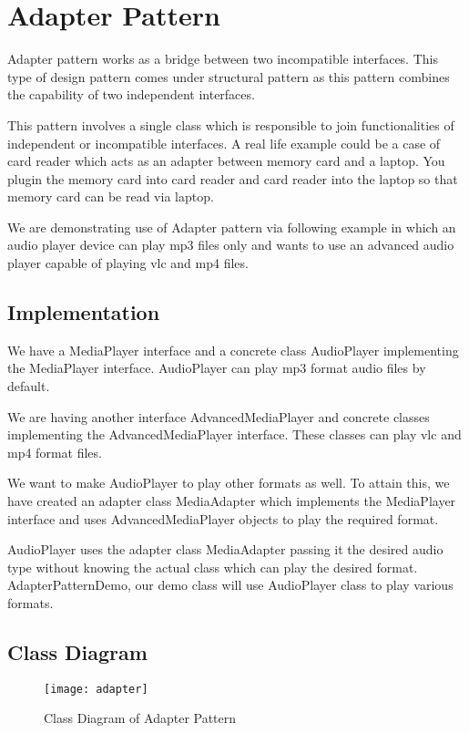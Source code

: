 \section{Adapter Pattern}

Adapter pattern works as a bridge between two incompatible interfaces. This type of design pattern comes under structural pattern as this pattern combines the capability of two independent interfaces.

This pattern involves a single class which is responsible to join functionalities of independent or incompatible interfaces. A real life example could be a case of card reader which acts as an adapter between memory card and a laptop. You plugin the memory card into card reader and card reader into the laptop so that memory card can be read via laptop.

We are demonstrating use of Adapter pattern via following example in which an audio player device can play mp3 files only and wants to use an advanced audio player capable of playing vlc and mp4 files. 

\subsection{Implementation}

We have a MediaPlayer interface and a concrete class AudioPlayer implementing the MediaPlayer interface. AudioPlayer can play mp3 format audio files by default.

We are having another interface AdvancedMediaPlayer and concrete classes implementing the AdvancedMediaPlayer interface. These classes can play vlc and mp4 format files.

We want to make AudioPlayer to play other formats as well. To attain this, we have created an adapter class MediaAdapter which implements the MediaPlayer interface and uses AdvancedMediaPlayer objects to play the required format.

AudioPlayer uses the adapter class MediaAdapter passing it the desired audio type without knowing the actual class which can play the desired format. AdapterPatternDemo, our demo class will use AudioPlayer class to play various formats.

\subsection{Class Diagram}

\begin{figure}[h]
\centering
\texttt{[image: adapter]}
\caption{Class Diagram of Adapter Pattern}
\end{figure}

